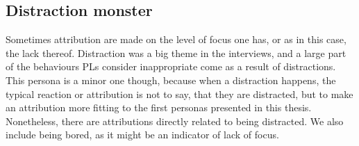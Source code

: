 \subsection{Distraction monster}

Sometimes attribution are made on the level of focus one has, or as in this case, the lack thereof. Distraction was a big theme in the interviews, and a large part of the behaviours PLs consider inappropriate come as a result of distractions. This persona is a minor one though, because when a distraction happens, the typical reaction or attribution is not to say, that they are distracted, but to make an attribution more fitting to the first personas presented in this thesis. Nonetheless, there are attributions directly related to being distracted. We also include being bored, as it might be an indicator of lack of focus.


